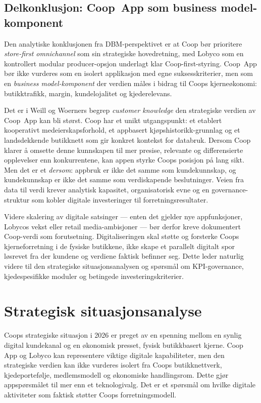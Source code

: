 \documentclass[12pt,a4paper]{article}
\begin{document}
\subsection{Delkonklusjon: Coop~App som business model-komponent}

Den analytiske konklusjonen fra DBM-perspektivet er at Coop bør prioritere \textit{store-first omnichannel} som sin strategiske hovedretning, med Lobyco som en kontrollert modular producer-opsjon underlagt klar Coop-first-styring. Coop~App bør ikke vurderes som en isolert applikasjon med egne suksesskriterier, men som en \textit{business model-komponent} der verdien måles i bidrag til Coops kjerneøkonomi: butikktrafikk, margin, kundelojalitet og kjederelevans.

Det er i Weill og Woerners begrep \textit{customer knowledge} den strategiske verdien av Coop~App kan bli størst. Coop har et unikt utgangspunkt: et etablert kooperativt medeierskapsforhold, et appbasert kjøpshistorikk-grunnlag og et landsdekkende butikknett som gir konkret kontekst for databruk. Dersom Coop klarer å omsette denne kunnskapen til mer presise, relevante og differensierte opplevelser enn konkurrentene, kan appen styrke Coops posisjon på lang sikt. Men det er et \textit{dersom}: appbruk er ikke det samme som kundekunnskap, og kundekunnskap er ikke det samme som verdiskapende beslutninger. Veien fra data til verdi krever analytisk kapasitet, organisatorisk evne og en governance-struktur som kobler digitale investeringer til forretningsresultater.

Videre skalering av digitale satsinger --- enten det gjelder nye appfunksjoner, Lobycos vekst eller retail media-ambisjoner --- bør derfor kreve dokumentert Coop-verdi som forutsetning. Digitaliseringen skal støtte og forsterke Coops kjerneforretning i de fysiske butikkene, ikke skape et parallelt digitalt spor løsrevet fra der kundene og verdiene faktisk befinner seg. Dette leder naturlig videre til den strategiske situasjonsanalysen og spørsmål om KPI-governance, kjedespesifikke moduler og betingede investeringskriterier.

\section{Strategisk situasjonsanalyse}

Coops strategiske situasjon i 2026 er preget av en spenning mellom en synlig digital kundekanal og en økonomisk presset, fysisk butikkbasert kjerne. Coop App og Lobyco kan representere viktige digitale kapabiliteter, men den strategiske verdien kan ikke vurderes isolert fra Coops butikknettverk, kjedeportefølje, medlemsmodell og økonomiske handlingsrom. Dette gjør appspørsmålet til mer enn et teknologivalg. Det er et spørsmål om hvilke digitale aktiviteter som faktisk støtter Coops forretningsmodell.
\end{document}
